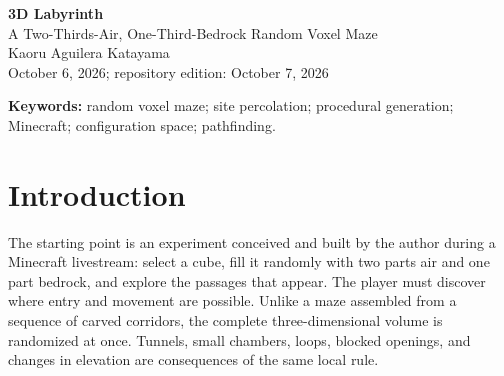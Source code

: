 \documentclass[11pt,letterpaper]{article}
\begin{document}
\thispagestyle{plain}
\begin{center}
 {\Large\bfseries\color{ink} 3D Labyrinth}\\[5pt]
 {\large A Two-Thirds-Air, One-Third-Bedrock Random Voxel Maze}\\[13pt]
 {\normalsize Kaoru Aguilera Katayama}\\[3pt]
 {\small October 6, 2026; repository edition: October 7, 2026}
\end{center}
\vspace{3pt}
\begin{abstract}
A simple Minecraft construction replaces the voxels of a cube independently
with air with probability $2/3$ and bedrock with probability $1/3$.
The resulting object is a three-dimensional labyrinth whose passages emerge
from random placement rather than from a prescribed corridor network.
We formalize this construction as finite site percolation and distinguish
connectivity of single air voxels from collision-free translation of an upright
two-voxel body. Exact formulas describe occupancy, adjacency, and the dependence
introduced by head clearance. A reproducible experiment uses 9,300 random cubes
to study face-to-face crossings, useful entrances, connected components, and
shortest routes. At the proposed density, all 300 cubes of each tested side
length $16$, $32$, and $64$ admit a crossing in both movement models.
At side length $64$, mean shortest-route length from a randomly selected open
entry is $1.207$ times the cube width in the one-voxel model and $1.604$ times
the width in the upright-body model, conditional on reaching the opposite face.
These results support the construction as a highly connected exploration maze
with nontrivial detours. We also describe how entrance selection and an explicit
movement rule turn the random volume into a well-defined playable challenge.
\end{abstract}
\noindent\textbf{Keywords:} random voxel maze; site percolation; procedural generation;
Minecraft; configuration space; pathfinding.

\section{Introduction}
The starting point is an experiment conceived and built by the author during a
Minecraft livestream: select a cube, fill it randomly with two parts air and one
part bedrock, and explore the passages that appear. The player must discover
where entry and movement are possible. Unlike a maze assembled from a sequence
of carved corridors, the complete three-dimensional volume is randomized at
once. Tunnels, small chambers, loops, blocked openings, and changes in elevation
are consequences of the same local rule.
\end{document}
